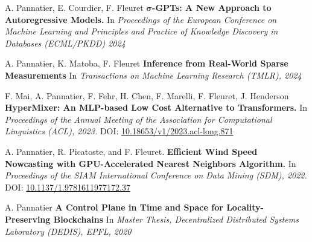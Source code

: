 \small
A. Pannatier, E. Courdier, F. Fleuret $\bm{\sigma}$\textbf{-GPTs: A New Approach to Autoregressive Models.} In \textit{Proceedings of the European Conference on Machine Learning and Principles and Practice of Knowledge Discovery in Databases (ECML/PKDD) 2024}
\commonvspace


A. Pannatier, K. Matoba, F. Fleuret \textbf{Inference from Real-World Sparse Measurements} In \textit{Transactions on Machine Learning Research (TMLR), 2024}
\commonvspace

F. Mai, A. Pannatier, F. Fehr, H. Chen, F. Marelli, F. Fleuret, J. Henderson \textbf{HyperMixer: An MLP-based Low Cost Alternative to Transformers.} In \textit{Proceedings of the Annual Meeting of the Association for Computational Linguistics (ACL), 2023.} DOI: \href{https://doi.org/10.18653/v1/2023.acl-long.871}{10.18653/v1/2023.acl-long.871}
\commonvspace

A. Pannatier, R. Picatoste, and F. Fleuret. \textbf{Efficient Wind Speed Nowcasting with GPU-Accelerated Nearest Neighbors Algorithm.} In \textit{Proceedings of the SIAM International Conference on Data Mining (SDM), 2022.} DOI: \href{https://doi.org/10.1137/1.9781611977172.37}{10.1137/1.9781611977172.37}
\commonvspace

A. Pannatier \textbf{A Control Plane in Time and Space for Locality-Preserving Blockchains} In \textit{Master Thesis, Decentralized Distributed Systems Laboratory (DEDIS), EPFL, 2020} \\
\commonvspace